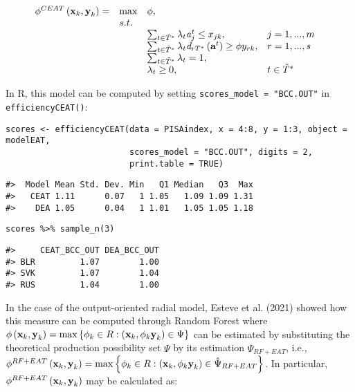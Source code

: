 \begin{equation} \label{(13)} 
\begin{array}{lllll} 
{\phi ^{CEAT} \left({\it \textbf{x}}_{k} ,{\it \textbf{y}}_{k} \right)=} & {\max } & {\phi, } & {} & {} \\ 
{} & {s.t.} & {} & {} & {} \\ 
{} & {} & {\sum_{t\in \tilde{T}^{*}}^{}\lambda_{t} {\it a}_{j}^{t}  \le x_{jk} ,} & {j=1,...,m} & {} \\ 
{} & {} & {\sum_{t\in \tilde{T}^{*}}^{}\lambda_{t} {\it d}_{rT^{*}} \left({\it \textbf{a}}^{t} \right) \ge \phi y_{rk} ,} & {r=1,...,s} & {} \\ 
{} & {} & {\sum_{t\in \tilde{T}^{*}}^{}\lambda_{t}=1,} & {} & {} \\ 
{} & {} & {\lambda _{t} \ge 0,} & {t\in \tilde{T}^{*}} & {} 
\end{array}
\end{equation}

In R, this model can be computed by setting \texttt{scores\_model\ =\ "BCC.OUT"} in \texttt{efficiencyCEAT()}:

\begin{verbatim}
scores <- efficiencyCEAT(data = PISAindex, x = 4:8, y = 1:3, object = modelEAT, 
                         scores_model = "BCC.OUT", digits = 2,
                         print.table = TRUE)
\end{verbatim}

\begin{verbatim}
#>  Model Mean Std. Dev. Min   Q1 Median   Q3  Max
#>   CEAT 1.11      0.07   1 1.05   1.09 1.09 1.31
#>    DEA 1.05      0.04   1 1.01   1.05 1.05 1.18
\end{verbatim}

\begin{verbatim}
scores %>% sample_n(3)
\end{verbatim}

\begin{verbatim}
#>     CEAT_BCC_OUT DEA_BCC_OUT
#> BLR         1.07        1.00
#> SVK         1.07        1.04
#> RUS         1.04        1.00
\end{verbatim}

In the case of the output-oriented radial model, Esteve et al. (2021) showed how this measure can be computed through Random Forest where \(\phi \left({\it \textbf{x}}_{k} ,{\it \textbf{y}}_{k} \right)=\max \left\{\phi _{k} \in R:\left({\it \textbf{x}}_{k} ,\phi_{k} {\it \textbf{y}}_{k} \right)\in \Psi \right\}\) can be estimated by substituting the theoretical production possibility set \(\Psi\) by its estimation \(\hat{\Psi}_{RF+EAT}\), i.e., \(\phi ^{RF+EAT} \left({\it \textbf{x}}_{k} ,{\it \textbf{y}}_{k} \right)= \max \left\{\phi _{k} \in R:\left({\it \textbf{x}}_{k} ,\phi _{k} {\it \textbf{y}}_{k} \right)\in \hat{\Psi }_{RF+EAT} \right\}\). In particular, \(\phi^{RF+EAT} \left({\it \textbf{x}}_{k} ,{\it \textbf{y}}_{k} \right)\) may be calculated as:

